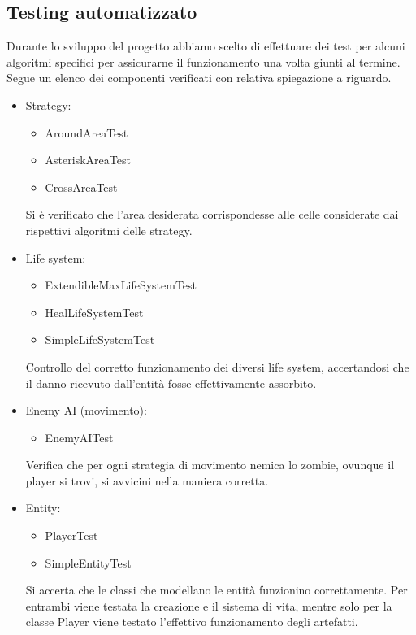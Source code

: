 \documentclass[a4paper,titlepage,12pt]{article}
\begin{document}
\subsection{Testing automatizzato}
Durante lo sviluppo del progetto abbiamo scelto di effettuare dei test per alcuni algoritmi specifici per assicurarne il funzionamento una volta giunti al termine. Segue un elenco dei componenti verificati con relativa spiegazione a riguardo.
\begin{itemize}
    \item Strategy:
        \begin{itemize}
            \item[\ding{51}] AroundAreaTest
            \item[\ding{51}] AsteriskAreaTest
            \item[\ding{51}] CrossAreaTest
        \end{itemize}
    \par \noindent Si è verificato che l'area desiderata corrispondesse alle celle considerate dai rispettivi algoritmi delle strategy.
    \item Life system:
        \begin{itemize}
            \item[\ding{51}] ExtendibleMaxLifeSystemTest
            \item[\ding{51}] HealLifeSystemTest
            \item[\ding{51}] SimpleLifeSystemTest
        \end{itemize}
    \par \noindent Controllo del corretto funzionamento dei diversi life system, accertandosi che il danno ricevuto dall'entità fosse effettivamente assorbito.
    \item Enemy AI (movimento):
        \begin{itemize}
            \item[\ding{51}] EnemyAITest
        \end{itemize}
    \par \noindent Verifica che per ogni strategia di movimento nemica lo zombie, ovunque il player si trovi, si avvicini nella maniera corretta.
    \item Entity:
        \begin{itemize}
            \item[\ding{51}] PlayerTest
            \item[\ding{51}] SimpleEntityTest
        \end{itemize}
    \par \noindent Si accerta che le classi che modellano le entità funzionino correttamente. Per entrambi viene testata la creazione e il sistema di vita, mentre solo per la classe Player viene testato l’effettivo funzionamento degli artefatti.

\end{itemize}
\end{document}
